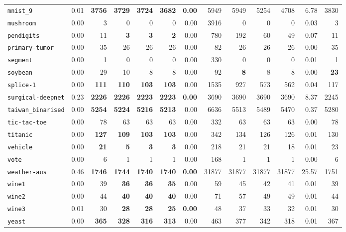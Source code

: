 \begin{tabular}{lrrrrrrrrrrrr}
\texttt{mnist\_9} & 0.01 & \textbf{3756} & \textbf{3729} & \textbf{3724} & \textbf{3682} & \textbf{0.00} & 5949 & 5949 & 5254 & 4708 & 6.78 & 3830\\
\texttt{mushroom} & 0.00 & 3 & 0 & 0 & 0 & 0.00 & 3916 & 0 & 0 & 0 & 0.03 & 3\\
\texttt{pendigits} & 0.00 & 11 & \textbf{3} & \textbf{3} & \textbf{2} & 0.00 & 780 & 192 & 60 & 49 & 0.07 & 11\\
\texttt{primary-tumor} & 0.00 & 35 & 26 & 26 & 26 & 0.00 & 82 & 26 & 26 & 26 & 0.00 & 35\\
\texttt{segment} & 0.00 & 1 & 0 & 0 & 0 & 0.00 & 330 & 0 & 0 & 0 & 0.01 & 1\\
\texttt{soybean} & 0.00 & 29 & 10 & 8 & 8 & 0.00 & 92 & \textbf{8} & 8 & 8 & 0.00 & \textbf{23}\\
\texttt{splice-1} & 0.00 & \textbf{111} & \textbf{110} & \textbf{103} & \textbf{103} & 0.00 & 1535 & 927 & 573 & 562 & 0.04 & 117\\
\texttt{surgical-deepnet} & 0.23 & \textbf{2226} & \textbf{2226} & \textbf{2223} & \textbf{2223} & \textbf{0.00} & 3690 & 3690 & 3690 & 3690 & 8.37 & 2245\\
\texttt{taiwan\_binarised} & 0.00 & \textbf{5254} & \textbf{5224} & \textbf{5216} & \textbf{5213} & 0.00 & 6636 & 5513 & 5489 & 5470 & 0.37 & 5280\\
\texttt{tic-tac-toe} & 0.00 & 78 & 63 & 63 & 63 & 0.00 & 332 & 63 & 63 & 63 & 0.00 & 78\\
\texttt{titanic} & 0.00 & \textbf{127} & \textbf{109} & \textbf{103} & \textbf{103} & 0.00 & 342 & 134 & 126 & 126 & 0.01 & 130\\
\texttt{vehicle} & 0.00 & \textbf{21} & \textbf{5} & \textbf{3} & \textbf{3} & 0.00 & 218 & 21 & 21 & 18 & 0.01 & 23\\
\texttt{vote} & 0.00 & 6 & 1 & 1 & 1 & 0.00 & 168 & 1 & 1 & 1 & 0.00 & 6\\
\texttt{weather-aus} & 0.46 & \textbf{1746} & \textbf{1744} & \textbf{1740} & \textbf{1740} & \textbf{0.00} & 31877 & 31877 & 31877 & 31877 & 25.57 & 1751\\
\texttt{wine1} & 0.00 & 39 & \textbf{36} & \textbf{36} & \textbf{35} & 0.00 & 59 & 45 & 42 & 41 & 0.01 & 39\\
\texttt{wine2} & 0.00 & 44 & \textbf{40} & \textbf{40} & \textbf{40} & 0.00 & 71 & 57 & 49 & 49 & 0.01 & 44\\
\texttt{wine3} & 0.01 & 30 & \textbf{28} & \textbf{28} & \textbf{25} & \textbf{0.00} & 48 & 37 & 33 & 32 & 0.01 & 30\\
\texttt{yeast} & 0.00 & \textbf{365} & \textbf{328} & \textbf{316} & \textbf{313} & 0.00 & 463 & 377 & 342 & 318 & 0.01 & 367\\
\bottomrule
\end{tabular}
